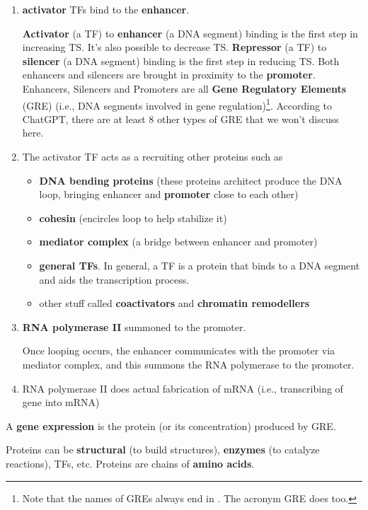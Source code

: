 \begin{enumerate}
\item {\bf activator}  TFs  bind to the {\bf enhancer}.

{\bf Activator} (a TF) to {\bf enhancer} (a DNA segment)  binding
is the first step in 
increasing TS.
It's also possible to decrease TS.
{\bf Repressor} (a TF) to {\bf silencer} (a DNA segment) binding  is the first step in reducing TS.
Both enhancers and silencers
are brought in
proximity to the {\bf promoter}. 
Enhancers, Silencers and Promoters  are all {\bf Gene Regulatory Elements} (GRE) (i.e., DNA segments
involved in gene regulation)\footnote{Note that the names of GREs always end in . The acronym GRE does too.}. According to
ChatGPT, there are at least 8 other types of GRE  that we won't discuss here.

\item The activator TF 
acts as a  recruiting other 
proteins such as

\begin{itemize}[\checkmark]
\item {\bf DNA bending proteins} (these proteins
architect produce the DNA loop,
bringing  enhancer and {\bf promoter} close to each other)
\item {\bf cohesin} (encircles loop to help stabilize it)
\item {\bf mediator complex} (a bridge between enhancer and promoter)
\item {\bf general TFs}. In general, a TF is a protein that binds to a DNA segment and aids the transcription process.
\item other stuff called {\bf coactivators} and {\bf chromatin remodellers}
\end{itemize}

\item {\bf RNA polymerase II} summoned to the
promoter.

Once looping occurs, the enhancer communicates with the promoter via mediator
complex, and this summons the RNA polymerase to the promoter.

\item RNA polymerase II does actual fabrication of mRNA (i.e., transcribing of gene into mRNA)
  
\end{enumerate}

A {\bf gene expression} is the protein (or its concentration) produced by GRE.

Proteins can be {\bf structural} (to build structures), {\bf enzymes} (to catalyze reactions), TFs, etc. Proteins
are chains of {\bf amino acids}.

